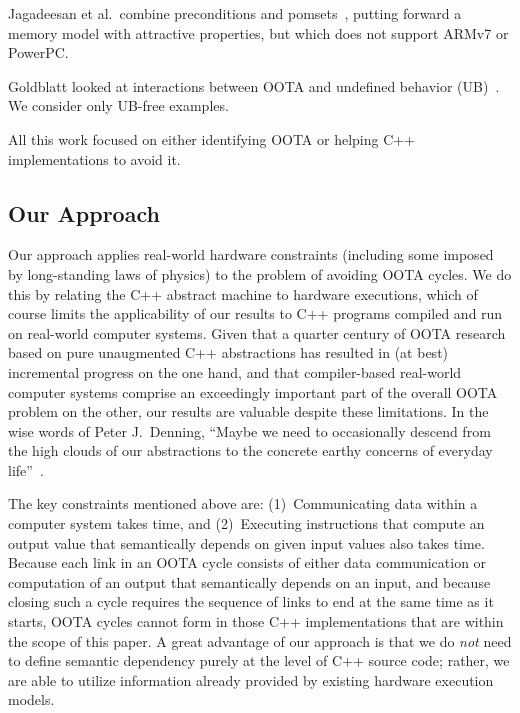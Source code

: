 Jagadeesan et al.~combine preconditions and
pomsets~\cite{RadhaJagadeesan2020OOTApomsetsPreconditions}, putting forward
a memory model with attractive properties, but which does not support
ARMv7 or PowerPC.

Goldblatt looked at interactions between OOTA and
undefined behavior (UB)~\cite{DavidGoldblatt2019NoElegantOOTAfix}.
We consider only UB-free examples.

All this work focused on either identifying OOTA or helping C++
implementations to avoid it.

\subsection{Our Approach}
\label{sec:Our Approach}

Our approach applies real-world hardware constraints (including some
imposed by long-standing laws of physics) to the problem of avoiding
OOTA cycles.
We do this by relating the C++ abstract machine to hardware executions,
which of course limits the applicability of our results to C++ programs
compiled and run on real-world computer systems.
Given that a quarter century of OOTA research based on pure unaugmented
C++ abstractions has resulted in (at best) incremental progress on the
one hand, and that
compiler-based real-world computer systems comprise an exceedingly
important part of the overall OOTA problem on the other, our results
are valuable despite these limitations.
In the wise words of Peter J.~Denning, ``Maybe we need to occasionally
descend from the high clouds of our abstractions to the concrete earthy
concerns of everyday life''~\cite{PeterJDenning2025Abstraction}.

The key constraints mentioned above are:
(1)~Communicating data within a computer system takes time, and
(2)~Executing instructions that compute an output value that semantically
depends on given input values also takes time.
Because each link in an OOTA cycle consists of either data communication
or computation of an output that semantically depends on an input,
and because closing such a cycle requires the sequence of links
to end at the same time as it
starts, OOTA cycles cannot form in those C++ implementations that are
within the scope of this paper.
A great advantage of our approach is that we do \emph{not} need to define
semantic dependency purely at the level of C++ source code;
rather, we are able to utilize information already provided by existing
hardware execution models.

